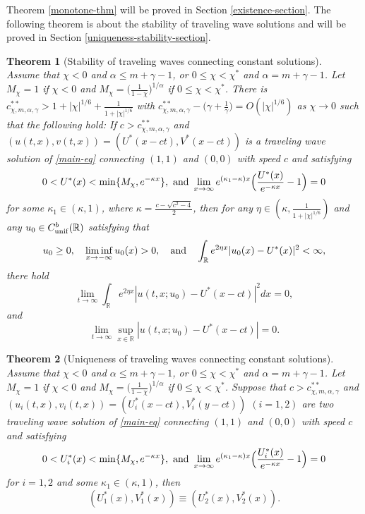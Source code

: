 \documentclass[11pt]{article} %
\newtheorem{theorem}{Theorem}[section] %
\theoremstyle{remark}
\theoremstyle{remark}
\numberwithin{equation}{section}
\numberwithin{figure}{section}
\numberwithin{table}{section}
\newcommand\RR{\ensuremath{\mathbb{R}}}
\begin{document}
Theorem \ref{monotone-thm} will be proved in Section \ref{existence-section}.
The following theorem is about the stability of traveling wave solutions and will be proved in Section \ref{uniqueness-stability-section}. 


\begin{theorem}[Stability of traveling waves connecting constant solutions]
\label{stability-thm}
$\quad$
Assume  that $\chi< 0$ and $\alpha\le m+\gamma-1$, or $0\le \chi<\chi^*$ and $\alpha= m+\gamma-1$.
Let $M_\chi=1$ if $\chi< 0$ and $M_\chi=\big(\frac{1}{1-\chi}\big)^{1/\alpha}$ if $0\le \chi<\chi^*$.
There is $c^{**}_{\chi,m,\alpha,\gamma}>1+|\chi|^{1/6}+\frac{1}{1+|\chi|^{1/6}}$ with $c^{**}_{\chi,m,\alpha,\gamma}-\big(\gamma+\frac{1}{\gamma}\big)=O(|\chi|^{1/6})$ as $\chi\to 0$ such that  the following hold:
 If $c>c_{\chi,m,\alpha,\gamma}^{**}$ and  
$(u(t,x),v(t,x))=(U^*(x-ct),V^*(x-ct))$ is a traveling wave solution of \eqref{main-eq} connecting $(1,1)$ and $(0,0)$ with speed $c$ and satisfying
\begin{equation}
\label{decay-rate-eq1}
0<U^*(x)<\min\{M_{\chi},e^{-\kappa x}\},\,\, {\rm and}\,\, \lim_{x\to\infty} e^{(\kappa_1-\kappa)x} \Big(\frac{U^*(x)}{e^{-\kappa x}}-1\Big)=0
\end{equation}
for some $\kappa_1\in (\kappa,1)$,  where $\kappa=\frac{c-\sqrt{c^2-4}}{2}$,
then 
 for any $\eta\in (\kappa,\frac{1}{1+|\chi|^{1/6}})$  and    any $u_0\in C_{\rm unif}^b(\RR)$ satisfying that
 \begin{equation}
\label{stability-u0-eq1}
u_0\ge 0,\quad
\liminf_{x\to -\infty}u_0(x)>0,\quad {\rm and}\quad \int_{\RR} e^{2\eta x}|u_0(x)-U^*(x)|^2<\infty,
\end{equation} 
 there hold
\begin{equation}
\label{main-stability-eq1}
\lim_{t\to\infty}\int_{\RR} e^{2\eta x}|u(t,x;u_0)-U^*(x-ct)|^2dx=0,
\end{equation}
and 
\begin{equation}
\label{main-stability-eq2}
\lim_{t\to\infty} \sup_{x\in\RR} |u(t,x;u_0)-U^*(x-ct)|=0.
\end{equation}
\end{theorem}



\begin{theorem}[Uniqueness of traveling waves connecting constant solutions]
\label{uniqueness-thm}
$\quad$
Assume  that $\chi< 0$ and $\alpha\le m+\gamma-1$, or $0\le \chi<\chi^*$ and $\alpha= m+\gamma-1$.
Let $M_\chi=1$ if $\chi< 0$ and $M_\chi=\big(\frac{1}{1-\chi}\big)^{1/\alpha}$ if $0\le \chi<\chi^*$. Suppose that  $c>c^{**}_{\chi,m,\alpha,\gamma}$ and 
$(u_i(t,x),v_i(t,x))=(U_i^*(x-ct),V_i^*(y-ct))$ $(i=1,2)$ are two  traveling wave solution of \eqref{main-eq} connecting $(1,1)$ and $(0,0)$ with speed $c$ and satisfying
\begin{equation}
\label{decay-rate-eq2}
0<U_i^*(x)<\min\{M_{\chi},e^{-\kappa x}\},\,\, {\rm and}\,\, \lim_{x\to\infty} e^{(\kappa_1-\kappa)x} \Big(\frac{U_i^*(x)}{e^{-\kappa x}}-1\Big)=0
\end{equation}
for $i=1,2$ and some $\kappa_1\in (\kappa,1)$, then
$$
(U_1^*(x),V_1^*(x))\equiv (U_2^*(x),V_2^*(x)).
$$
\end{theorem}
\end{document}
